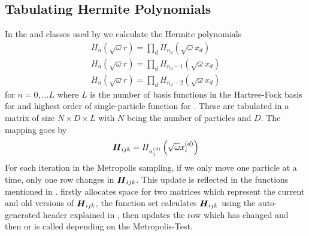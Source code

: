 \subsection{Tabulating Hermite Polynomials}
    In the  and  classes
    used by  we calculate the Hermite polynomials
        \begin{equation}
            \begin{aligned}
                H_n(\sqrt{\omega}r) = \prod_d
                H_{n_d}\left(\sqrt{\omega}x_d\right) \\
                H_n(\sqrt{\omega}r) = \prod_d
                H_{n_d-1}\left(\sqrt{\omega}x_d\right) \\
                H_n(\sqrt{\omega}r) = \prod_d
                H_{n_d-2}\left(\sqrt{\omega}x_d\right)
            \end{aligned}
        \end{equation}
    for $n=0,\dots L$ where $L$ is the number of basis functions in the
    Hartree-Fock basis for  and highest order of
    single-particle function for . These are
    tabulated in a matrix of size $N\times D\times L$ with $N$ being the number
    of particles and $D$. The mapping goes by
        \begin{equation}
            \boldsymbol{{H}}_{ijk} = H_{n^{(d)}_j}\left(\sqrt{\omega}x^{(d)}_i\right)
        \end{equation}
    For each iteration in the Metropolis sampling, if we only move one particle
    at a time, only one row changes in $\boldsymbol{{H}}_{ijk}$. This update is
    reflected in the functions mentioned in .
     firstly allocates space for two matrices
    which represent the current and old versions of $\boldsymbol{{H}}_{ijk}$, the
     function set calculates $\boldsymbol{{H}}_{ijk}$ using the
    auto-generated header explained in ,
     then updates the row which has changed and then
     or  is called depending on the
    Metropolis-Test.

